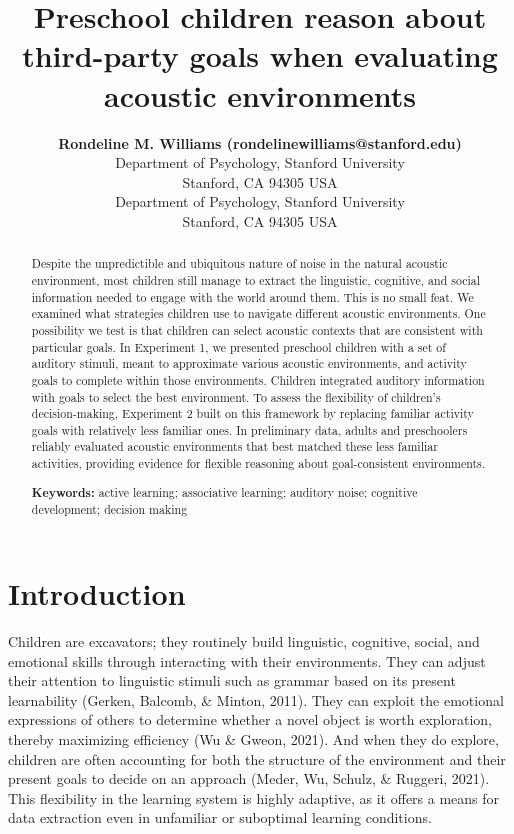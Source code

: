 \documentclass[10pt, letterpaper]{article}
\title{Preschool children reason about third-party goals when evaluating
acoustic environments}
\author{{\large \bf Rondeline M. Williams (rondelinewilliams@stanford.edu)} \\ Department of Psychology, Stanford University \\ Stanford, CA 94305 USA \AND {\large \bf Michael C.~Frank (mcfrank@stanford.edu)} \\ Department of Psychology, Stanford University \\ Stanford, CA 94305 USA}
\begin{document}
\maketitle

\begin{abstract}
Despite the unpredictible and ubiquitous nature of noise in the natural
acoustic environment, most children still manage to extract the
linguistic, cognitive, and social information needed to engage with the
world around them. This is no small feat. We examined what strategies
children use to navigate different acoustic environments. One
possibility we test is that children can select acoustic contexts that
are consistent with particular goals. In Experiment 1, we presented
preschool children with a set of auditory stimuli, meant to approximate
various acoustic environments, and activity goals to complete within
those environments. Children integrated auditory information with goals
to select the best environment. To assess the flexibility of children's
decision-making, Experiment 2 built on this framework by replacing
familiar activity goals with relatively less familiar ones. In
preliminary data, adults and preschoolers reliably evaluated acoustic
environments that best matched these less familiar activities, providing
evidence for flexible reasoning about goal-consistent environments.

\textbf{Keywords:}
active learning; associative learning; auditory noise; cognitive
development; decision making
\end{abstract}

\hypertarget{introduction}{%
\section{Introduction}\label{introduction}}

Children are excavators; they routinely build linguistic, cognitive,
social, and emotional skills through interacting with their
environments. They can adjust their attention to linguistic stimuli such
as grammar based on its present learnability (Gerken, Balcomb, \&
Minton, 2011). They can exploit the emotional expressions of others to
determine whether a novel object is worth exploration, thereby
maximizing efficiency (Wu \& Gweon, 2021). And when they do explore,
children are often accounting for both the structure of the environment
and their present goals to decide on an approach (Meder, Wu, Schulz, \&
Ruggeri, 2021). This flexibility in the learning system is highly
adaptive, as it offers a means for data extraction even in unfamiliar or
suboptimal learning conditions.
\end{document}
